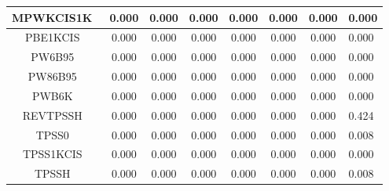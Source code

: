 \begin{tabular}{|c|c|c|c|c|c|c|l|}
                                   MPWKCIS1K~\cite{Zhao2005_2012} &                0.000 &                          0.000 &             0.000 &                        0.000 &                0.000 &                0.000 &                       0.000 \\ \hline
                                     PBE1KCIS~\cite{Zhao2005_415} &                0.000 &                          0.000 &             0.000 &                        0.000 &                0.000 &                0.000 &                       0.000 \\ \hline
                                      PW6B95~\cite{Zhao2005_5656} &                0.000 &                          0.000 &             0.000 &                        0.000 &                0.000 &                0.000 &                       0.000 \\ \hline
                                    PW86B95~\cite{Becke1996_1040} &                0.000 &                          0.000 &             0.000 &                        0.000 &                0.000 &                0.000 &                       0.000 \\ \hline
                                       PWB6K~\cite{Zhao2005_5656} &                0.000 &                          0.000 &             0.000 &                        0.000 &                0.000 &                0.000 &                       0.000 \\ \hline
                                  REVTPSSH~\cite{Csonka2010_3688} &                0.000 &                          0.000 &             0.000 &                        0.000 &                0.000 &                0.000 &                       0.424 \\ \hline
                                     TPSS0~\cite{Grimme2005_3067} &                0.000 &                          0.000 &             0.000 &                        0.000 &                0.000 &                0.000 &                       0.008 \\ \hline
                                     TPSS1KCIS~\cite{Zhao2005_43} &                0.000 &                          0.000 &             0.000 &                        0.000 &                0.000 &                0.000 &                       0.000 \\ \hline
                                TPSSH~\cite{Staroverov2003_12129} &                0.000 &                          0.000 &             0.000 &                        0.000 &                0.000 &                0.000 &                       0.008 \\ \hline

\end{tabular}
